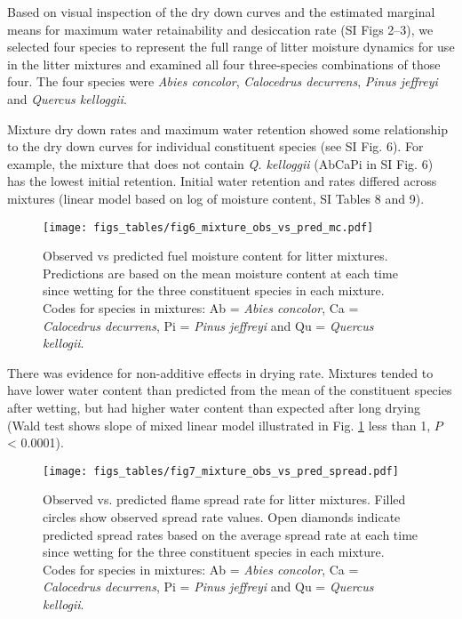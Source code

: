 \documentclass[letterpaper,12pt]{article}
\begin{document}
Based on visual inspection of the dry down curves and the estimated marginal
means for maximum water retainability and desiccation rate (SI Figs 2--3), we
selected four species to represent the full range of litter moisture dynamics
for use in the litter mixtures and examined all four three-species combinations
of those four. The four species were \emph{Abies concolor}, \emph{Calocedrus
  decurrens}, \emph{Pinus jeffreyi} and \emph{Quercus kelloggii}.

Mixture dry down rates and maximum water retention showed some relationship to
the dry down curves for individual constituent species (see SI Fig. 6). For
example, the mixture that does not contain \emph{Q. kelloggii} (AbCaPi in SI
Fig. 6) has the lowest initial retention. Initial water retention and rates
differed across mixtures (linear model based on log of moisture content, SI Tables 8 and 9).




\begin{figure}[h]
  \centering
\texttt{[image: figs\_tables/fig6\_mixture\_obs\_vs\_pred\_mc.pdf]}
\caption{Observed vs predicted fuel moisture content for litter mixtures.
  Predictions are based on the mean moisture content at each time since wetting
  for the three constituent species in each mixture. Codes for species in
  mixtures: Ab = \emph{Abies concolor}, Ca = \emph{Calocedrus decurrens}, Pi =
  \emph{Pinus jeffreyi} and Qu = \emph{Quercus kellogii}.}
  \label{fig:mixture_obs_pred_mc}
\end{figure}

There was evidence for non-additive effects in drying rate. Mixtures tended to
have lower water content than predicted from the mean of the constituent
species after wetting, but had higher water content than expected after long
drying (Wald test shows slope of mixed linear model illustrated in Fig.
\ref{fig:mixture_obs_pred_mc} less than 1, $P$ < 0.0001).


\begin{figure}[h]
  \centering
\texttt{[image: figs\_tables/fig7\_mixture\_obs\_vs\_pred\_spread.pdf]}
\caption{Observed vs. predicted flame spread rate for litter mixtures. Filled
  circles show observed spread rate values. Open diamonds indicate predicted
  spread rates based on the average spread rate at each time since wetting for
  the three constituent species in each mixture. Codes for species in mixtures:
  Ab = \emph{Abies concolor}, Ca = \emph{Calocedrus decurrens}, Pi =
  \emph{Pinus jeffreyi} and Qu = \emph{Quercus kellogii}.}
  \label{fig:mixture_obs_pred_spread}
\end{figure}
\end{document}
